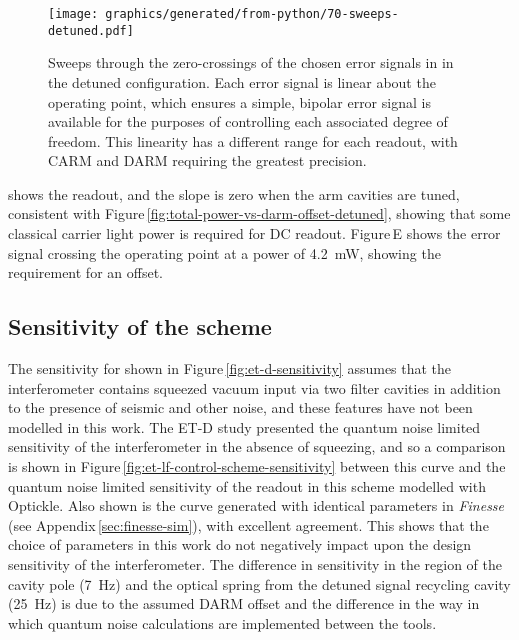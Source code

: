 \begin{figure}
  \centering
  \texttt{[image: graphics/generated/from-python/70-sweeps-detuned.pdf]}
  \caption[Sweeps through the zero-crossings of the chosen error signals in ET-LF]{\label{fig:sweeps-et-lf}Sweeps through the zero-crossings of the chosen error signals in \ETLF{} in the detuned configuration. Each error signal is linear about the operating point, which ensures a simple, bipolar error signal is available for the purposes of controlling each associated degree of freedom. This linearity has a different range for each readout, with \gls{CARM} and \gls{DARM} requiring the greatest precision.}
\end{figure}

 shows the \ASDC{} readout, and the slope is zero when the arm cavities are tuned, consistent with Figure\,\ref{fig:total-power-vs-darm-offset-detuned}, showing that some classical carrier light power is required for \gls{DC} readout. Figure\,E shows the error signal crossing the operating point at a power of \SI{4.2}{\milli\watt}, showing the requirement for an offset.

\subsection{Sensitivity of the scheme}
The sensitivity for \ETLF{} shown in Figure\,\ref{fig:et-d-sensitivity} assumes that the interferometer contains squeezed vacuum input via two filter cavities in addition to the presence of seismic and other noise, and these features have not been modelled in this work. The ET-D study presented the quantum noise limited sensitivity of the interferometer in the absence of squeezing, and so a comparison is shown in Figure\,\ref{fig:et-lf-control-scheme-sensitivity} between this curve and the quantum noise limited sensitivity of the \ASDC{} readout in this scheme modelled with Optickle. Also shown is the curve generated with identical parameters in \emph{Finesse} (see Appendix\,\ref{sec:finesse-sim}), with excellent agreement. This shows that the choice of parameters in this work do not negatively impact upon the design sensitivity of the interferometer. The difference in sensitivity in the region of the cavity pole (\SI{7}{\hertz}) and the optical spring from the detuned signal recycling cavity (\SI{25}{\hertz}) is due to the assumed \gls{DARM} offset and the difference in the way in which quantum noise calculations are implemented between the tools.

